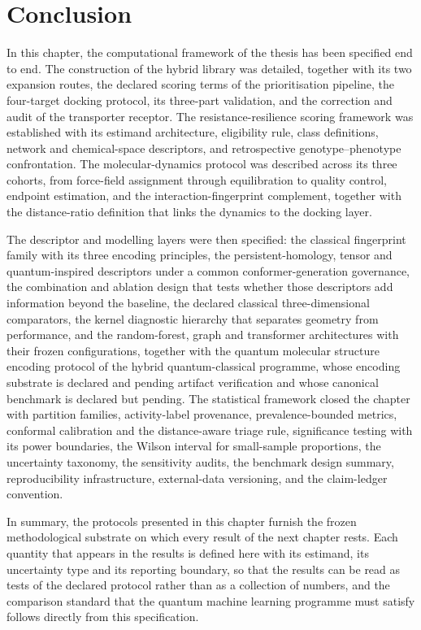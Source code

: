 \section{Conclusion}

In this chapter, the computational framework of the thesis has been specified end to end. The construction of the hybrid library was detailed, together with its two expansion routes, the declared scoring terms of the prioritisation pipeline, the four-target docking protocol, its three-part validation, and the correction and audit of the transporter receptor. The resistance-resilience scoring framework was established with its estimand architecture, eligibility rule, class definitions, network and chemical-space descriptors, and retrospective genotype--phenotype confrontation. The molecular-dynamics protocol was described across its three cohorts, from force-field assignment through equilibration to quality control, endpoint estimation, and the interaction-fingerprint complement, together with the distance-ratio definition that links the dynamics to the docking layer.

The descriptor and modelling layers were then specified: the classical fingerprint family with its three encoding principles, the persistent-homology, tensor and quantum-inspired descriptors under a common conformer-generation governance, the combination and ablation design that tests whether those descriptors add information beyond the baseline, the declared classical three-dimensional comparators, the kernel diagnostic hierarchy that separates geometry from performance, and the random-forest, graph and transformer architectures with their frozen configurations, together with the quantum molecular structure encoding protocol of the hybrid quantum-classical programme, whose encoding substrate is declared and pending artifact verification and whose canonical benchmark is declared but pending. The statistical framework closed the chapter with partition families, activity-label provenance, prevalence-bounded metrics, conformal calibration and the distance-aware triage rule, significance testing with its power boundaries, the Wilson interval for small-sample proportions, the uncertainty taxonomy, the sensitivity audits, the benchmark design summary, reproducibility infrastructure, external-data versioning, and the claim-ledger convention.

In summary, the protocols presented in this chapter furnish the frozen methodological substrate on which every result of the next chapter rests. Each quantity that appears in the results is defined here with its estimand, its uncertainty type and its reporting boundary, so that the results can be read as tests of the declared protocol rather than as a collection of numbers, and the comparison standard that the quantum machine learning programme must satisfy follows directly from this specification.
